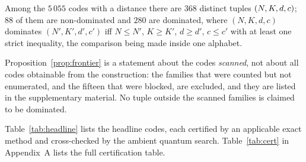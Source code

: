 \begin{proposition}\label{prop:frontier}
Among the $5\,055$ codes with a distance there are $368$ distinct tuples
$(N,K,d,c)$; $88$ of them are non-dominated and $280$ are dominated, where
$(N,K,d,c)$ dominates $(N',K',d',c')$ iff
$N\le N'$, $K\ge K'$, $d\ge d'$, $c\le c'$ with at least one strict
inequality, the comparison being made inside one alphabet.
\end{proposition}

\begin{remark}
Proposition~\ref{prop:frontier} is a statement about the codes \emph{scanned},
not about all codes obtainable from the construction: the families that were
counted but not enumerated, and the fifteen that were blocked, are excluded, and
they are listed in the supplementary material. No tuple outside the scanned
families is claimed to be dominated.
\end{remark}

Table~\ref{tab:headline} lists the headline codes, each certified by an
applicable exact method and cross-checked by the ambient quantum search. Table~\ref{tab:cert} in Appendix~A lists the full certification table.

